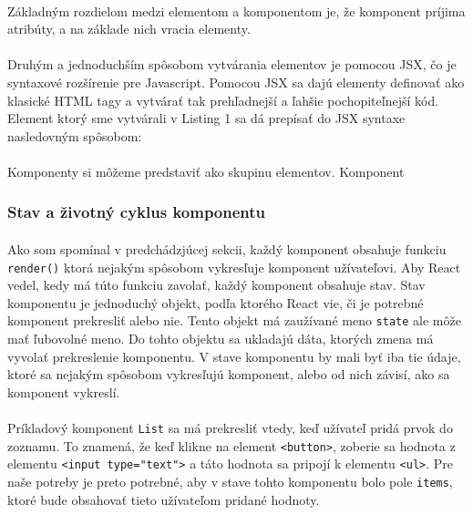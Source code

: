 \paragraph{}
Základným rozdielom medzi elementom a komponentom je, že komponent príjima atribúty, a na základe nich vracia elementy.

\paragraph{}
Druhým a jednoduchším spôsobom vytvárania elementov je pomocou JSX, čo je syntaxové rozšírenie pre Javascript. Pomocou JSX sa dajú elementy definovať ako klasické HTML tagy a vytvárať tak prehľadnejší a ľahšie pochopiteľnejší kód. Element ktorý sme vytvárali v Listing 1 sa dá prepísať do JSX syntaxe nasledovným spôsobom:


\paragraph{}
Komponenty si môžeme predstaviť ako skupinu elementov. Komponent 

\subsubsection{Stav a  životný cyklus komponentu}

\paragraph{}
Ako som spomínal v predchádzjúcej sekcii, každý komponent obsahuje funkciu \texttt{render()} ktorá nejakým spôsobom vykresľuje komponent užívateľovi. Aby React vedel, kedy má túto funkciu zavolať, každý komponent obsahuje stav.  Stav komponentu je jednoduchý objekt, podľa ktorého React vie, či je potrebné komponent prekresliť alebo nie. Tento objekt má zaužívané meno \texttt{state} ale môže mať ľubovolné meno. Do tohto objektu sa ukladajú dáta, ktorých zmena má vyvolať prekreslenie komponentu. V stave komponentu by mali byť iba tie údaje, ktoré sa nejakým spôsobom vykresľujú komponent, alebo od nich závisí, ako sa komponent vykreslí. 

\paragraph{}
Príkladový komponent \texttt{List} sa má prekresliť vtedy, keď užívateľ pridá prvok do zoznamu. To znamená, že keď klikne na element \texttt{<button>}, zoberie sa hodnota z elementu \texttt{<input type="text">} a táto hodnota sa pripojí k elementu \texttt{<ul>}. Pre naše potreby je preto potrebné, aby v stave tohto komponentu bolo pole \texttt{items}, ktoré bude obsahovať tieto užívateľom pridané hodnoty.

